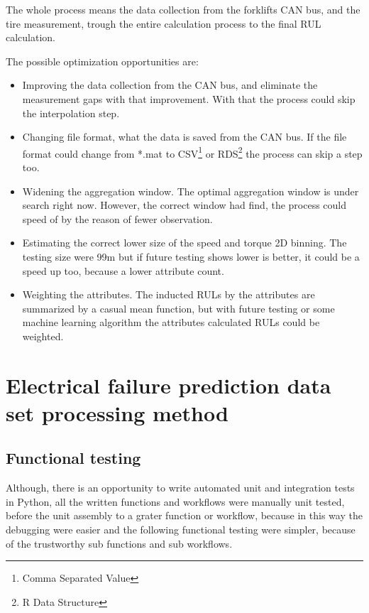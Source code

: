 The whole process means the data collection from the forklifts CAN bus, and the tire measurement, trough the entire calculation process to the final RUL calculation.

The possible optimization opportunities are:
\begin{itemize}
	\item{Improving the data collection from the CAN bus, and eliminate the measurement gaps with that improvement.} With that the process could skip the interpolation step. 
	\item{Changing file format, what the data is saved from the CAN bus.} If the file format could change from *.mat to CSV\footnote{Comma Separated Value} or RDS\footnote{R Data Structure} the process can skip a step too.
	\item{Widening the aggregation window.} The optimal aggregation window is under search right now. However, the correct window had find, the process could speed of by the reason of fewer observation.
	\item{Estimating the correct lower size of the speed and torque 2D binning.} The testing size were 9\*9m but if future testing shows lower is better, it could be a speed up too, because a lower attribute count.
	\item{Weighting the attributes.} The inducted RULs by the attributes are summarized by a casual mean function, but with future testing or some machine learning algorithm the attributes calculated RULs could be weighted.
\end{itemize} 
\section{Electrical failure prediction data set processing method}
\subsection{Functional testing}
Although, there is an opportunity to write automated unit and integration tests in Python, all the written functions and workflows were manually unit tested, before the unit assembly to a grater function or workflow, because in this way the debugging were easier and the following functional testing were simpler, because of the trustworthy sub functions and sub workflows.

